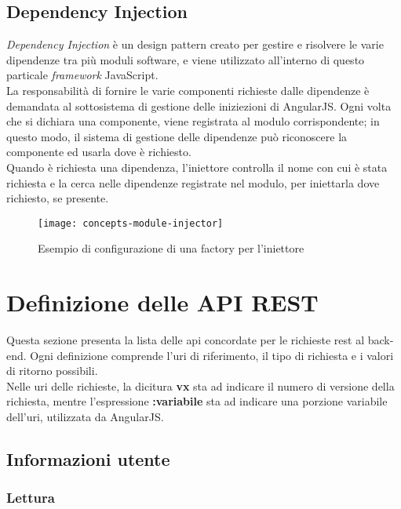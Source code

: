 \subsection{Dependency Injection}
\emph{Dependency Injection} è un design pattern creato per gestire e risolvere le varie dipendenze tra più moduli software, e viene utilizzato all'interno di questo particale \emph{framework} JavaScript.\\
La responsabilità di fornire le varie componenti richieste dalle dipendenze è demandata al sottosistema di gestione delle iniziezioni di AngularJS. Ogni volta che si dichiara una componente, viene registrata al modulo corrispondente; in questo modo, il sistema di gestione delle dipendenze può riconoscere la componente ed usarla dove è richiesto.\\
Quando è richiesta una dipendenza, l'iniettore controlla il nome con cui è stata richiesta e la cerca nelle dipendenze registrate nel modulo, per iniettarla dove richiesto, se presente.

\begin{figure}[!h] 
    \centering 
    \texttt{[image: concepts-module-injector]} 
    \caption{Esempio di configurazione di una factory per l'iniettore}
\end{figure}


\section{Definizione delle API REST}
Questa sezione presenta la lista delle \gls{api} concordate per le richieste \gls{rest} al \gls{back-end}. Ogni definizione comprende l'\gls{uri} di riferimento, il tipo di richiesta e i valori di ritorno possibili.\\
Nelle \gls{uri} delle richieste, la dicitura \textbf{vx} sta ad indicare il numero di versione della richiesta, mentre l'espressione \textbf{:variabile} sta ad indicare una porzione variabile dell'\gls{uri}, utilizzata da AngularJS.

\subsection{Informazioni utente}

\subsubsection{Lettura}

